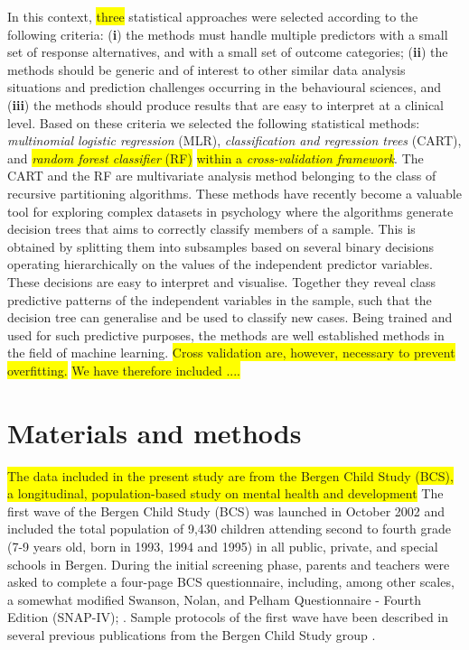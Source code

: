 \documentclass[10pt,letterpaper]{article}
\begin{document}
In this context, \colorbox{yellow}{three} statistical approaches were selected according to the following criteria: ({\bf i}) the methods must handle multiple predictors with a small set of response alternatives, and with a small set of outcome categories; ({\bf ii}) the methods should be generic and of interest to other similar data analysis situations  
and prediction challenges  occurring in the behavioural sciences, and ({\bf iii}) the methods should produce results that are easy to interpret at a clinical level. 
Based on these criteria we selected the following statistical methods: {\em multinomial logistic regression} (MLR), {\em classification and regression trees} (CART), and \colorbox{yellow}{{\em random forest classifier} (RF)} \colorbox{yellow}{within a {\em cross-validation framework}}. 
The CART and the RF are multivariate analysis method belonging to the class of recursive partitioning algorithms. 
These methods have recently become a valuable tool for 
exploring complex datasets in psychology where the algorithms generate decision trees that aims to correctly classify members of a sample. This is obtained by splitting 
them into subsamples based on several binary decisions operating hierarchically on the values of the independent predictor variables. These decisions
are easy to interpret and visualise. Together they reveal class predictive patterns of the independent variables in the sample, such that the decision tree can generalise 
and be used to classify new cases. Being trained and used for such predictive purposes, the methods are well established methods in the field of machine learning. \colorbox{yellow}{Cross validation are, however, necessary to prevent overfitting.} \colorbox{yellow}{We have therefore included ....}


\section*{Materials and methods}
\colorbox{yellow}{The data included in the present study are from the Bergen Child Study (BCS),} \colorbox{yellow}{ a longitudinal, population-based study on mental health and development}
The first wave of the Bergen Child Study (BCS) was launched in October 2002 and included the total population of 9,430 children attending second to fourth grade (7-9 years old, born in 1993, 1994 and 1995) in all public, private, and special schools in Bergen. 
During the initial screening phase, parents and teachers were asked to complete a four-page BCS questionnaire, including, among other scales, a somewhat modified Swanson, Nolan, and Pelham Questionnaire - Fourth Edition (SNAP-IV); \cite{Swanson1992}.
Sample protocols of the first wave have been described in several previous publications from the Bergen Child Study group 
\cite{Heiervang2007, Lundervold2011, Sivertsen2015}.\\
\end{document}
